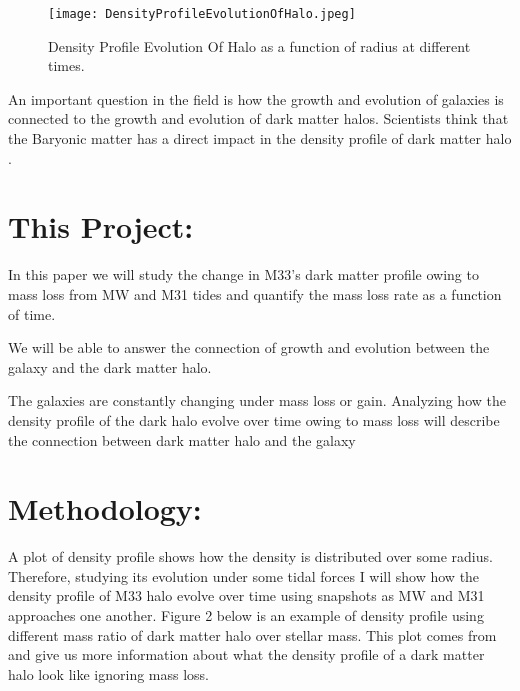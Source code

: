\documentclass{aastex63}
\begin{document}
\vspace{0.5mm}

\begin{figure}[h]
    \centering
    \texttt{[image: DensityProfileEvolutionOfHalo.jpeg]}
    \caption{\cite{Delos19} Density Profile Evolution Of Halo as a function of radius at different times.}
    \label{fig:galaxy}
\end{figure}
\vspace{0.5mm}

An important question in the field is how the growth and evolution of galaxies is connected to the growth and evolution of dark matter halos. Scientists think that the Baryonic matter has a direct impact in the density profile of dark matter halo \citep{Grillo12}.
\vspace{5mm}

\section{This Project:}

In this paper we will study the change in M33’s dark matter profile owing to mass loss from MW and M31 tides and quantify the mass loss rate as a function of time.
\vspace{0.5mm}

We will be able to answer the connection of growth and evolution between the galaxy and the dark matter halo.
\vspace{0.5mm}

The galaxies are constantly changing under mass loss or gain. Analyzing how the density profile of the dark halo evolve over time owing to mass loss will describe the connection between dark matter halo and the galaxy
\vspace{5mm}

\section{Methodology:}

A plot of density profile shows how the density is distributed over some radius. Therefore, studying its evolution under some tidal forces
\vspace{0.5mm}
I will show how the density profile of M33 halo evolve over time using snapshots as MW and M31 approaches one another. 
\vspace{0.5mm}
Figure 2 below is an example of density profile using different mass ratio of dark matter halo over stellar mass. This plot comes from \cite{Conroy11} and give us more information about what the density profile of a dark matter halo look like ignoring mass loss.
\end{document}
